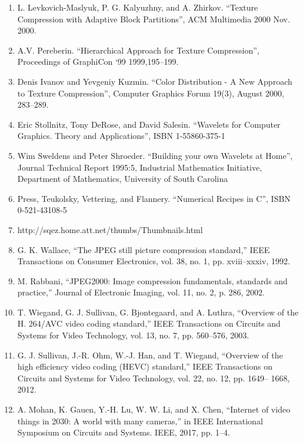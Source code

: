 \documentclass{article}
\begin{document}
\begin{enumerate}
	\item L. Levkovich-Maslyuk, P. G. Kalyuzhny, and A.
	Zhirkov. “Texture Compression with Adaptive Block
	Partitions”, ACM Multimedia 2000 Nov. 2000.

	\item A.V. Pereberin. “Hierarchical Approach for Texture Compression”, Proceedings of GraphiCon ‘99
	1999,195–199.
	
	\item Denis Ivanov and Yevgeniy Kuzmin. “Color Distribution - A New Approach to Texture Compression”, Computer Graphics Forum 19(3), August 2000, 283–289.
	
	\item Eric Stollnitz, Tony DeRose, and David Salesin.
	“Wavelets for Computer Graphics. Theory and Applications”, ISBN 1-55860-375-1
	\item Wim Sweldens and Peter Shroeder. “Building your own
	Wavelets at Home”, Journal Technical Report 1995:5,	Industrial Mathematics Initiative, Department of Mathematics, University of South Carolina

	\item Press, Teukolsky, Vettering, and Flannery. “Numerical
	Recipes in C”, ISBN 0-521-43108-5
	
	\item http://sqez.home.att.net/thumbs/Thumbnails.html
	
	\item G. K. Wallace, “The JPEG still picture compression standard,” IEEE
	Transactions on Consumer Electronics, vol. 38, no. 1, pp. xviii–xxxiv,
	1992.
	
	\item M. Rabbani, “JPEG2000: Image compression fundamentals, standards
	and practice,” Journal of Electronic Imaging, vol. 11, no. 2, p. 286,
	2002.
	
	\item T. Wiegand, G. J. Sullivan, G. Bjontegaard, and A. Luthra, “Overview of
	the H. 264/AVC video coding standard,” IEEE Transactions on Circuits
	and Systems for Video Technology, vol. 13, no. 7, pp. 560–576, 2003.
	
	\item G. J. Sullivan, J.-R. Ohm, W.-J. Han, and T. Wiegand, “Overview of the
	high efficiency video coding (HEVC) standard,” IEEE Transactions on
	Circuits and Systems for Video Technology, vol. 22, no. 12, pp. 1649–
	1668, 2012.
	
	\item A. Mohan, K. Gauen, Y.-H. Lu, W. W. Li, and X. Chen, “Internet
	of video things in 2030: A world with many cameras,” in IEEE
	International Symposium on Circuits and Systems. IEEE, 2017, pp.
	1–4.
	

\end{enumerate}
\end{document}
